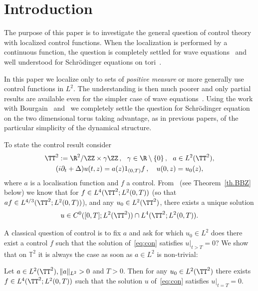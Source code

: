 \section{Introduction}\label{in}

The purpose of this paper is to investigate the general question of control theory with localized control functions. When the localization is performed by a continuous function, the question is completely settled for wave equations~\cite{BLR,BG} and well understood for Schrödinger equations on tori~\cite{Ha, Ja, Ko, BZ4, AM}.

In this paper we localize only to sets of \emph{positive measure} or more generally use control functions in $ L^2 $. The understanding is then much poorer and only partial results are available even for the simpler case of wave equations~\cite{Bu16,Bu17}. Using the work with Bourgain~\cite{BBZ} and~\cite{BZ4} we completely settle the question for Schrödinger equation on the two dimensional torus taking advantage, as in previous papers, of the particular simplicity of the dynamical structure.


To state the control result consider
\begin{equation}\label{eq:con}
\begin{gathered} \TT^2 : = \R^2 / \ZZ \times \gamma \ZZ \,, \ \ \gamma \in \R \setminus \{
0 \}\,, \ \ a \in L^2 (\TT^2), \\
(i \partial_t + \Delta) u (t, z) = a(z) 1_{(0,T)}f \,, \ \ \ u (0, z) =u_0 (z),
\end{gathered}
\end{equation}
where $a $ is a localisation function and $f$ a control. From~\cite[Proposition~2.2]{BBZ} (see Theorem~\ref{th.BBZ} below) we know that for $f \in L^{4}(\TT^2 ; L^2(0,T))$ (so that $af \in L^{4/3}(\TT^2 ; L^2(0,T))$), and any $u_0 \in L^2(\TT^2)$, there exists a unique solution
\[
u \in C^0 ([0,T]; L^2(\TT^2)) \cap L^4 (\TT^2; L^2(0,T)).
\]

A classical question of control is to fix $ a $ and ask for which $u_0 \in L^2$ does there exist a control $f$ such that the solution of~\eqref{eq:con} satisfies $u |_{t>T} =0$? We show that on $\mathbb{T}^2$ it is always the case as soon as $a \in L^2$ is non-trivial:

\begin{theo}\label{th.2}
Let $a \in L^2(\TT^2), \| a \|_{L^2} >0$ and $ T > 0 $. Then for any $u_0\in L^2(\TT^2)$ there exists $f \in L^4(\TT^2 ; L^2(0,T))$ such that the solution $u$ of~\eqref{eq:con} satisfies $u |_{t=T} =0$.
\end{theo}

